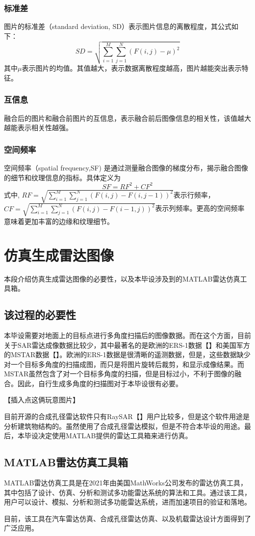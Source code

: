 \documentclass{xduugthesis}
\begin{document}
\subsubsection{标准差}
图片的标准差（standard deviation, SD）表示图片信息的离散程度，其公式如下：
$$SD=\sqrt{\sum_{i=1}^{M}\sum_{j=1}^{N}(F(i,j)-\mu)^2}$$
其中$\mu$表示图片的均值。其值越大，表示数据离散程度越高，图片越能突出表示特征。
\subsubsection{互信息}
融合后的图片和融合前图片的互信息，表示融合前后图像信息的相关性，该值越大越能表示相关性越强。
\subsubsection{空间频率}
空间频率（spatial frequency,SF) 是通过测量融合图像的梯度分布，揭示融合图像的细节和纹理信息的指标。具体定义为
$$SF = RF^2 + CF^2$$
式中, $RF = \sqrt{\sum_{i=1}^{M}\sum_{j=1}^{N}(F(i,j)-F(i,j-1))^2}$表示行频率，$CF = \sqrt{\sum_{i=1}^{M}\sum_{j=1}^{N}(F(i,j)-F(i-1,j))^2}$表示列频率。更高的空间频率意味着更加丰富的边缘和纹理细节。
\section{仿真生成雷达图像}
本段介绍仿真生成雷达图像的必要性，以及本毕设涉及到的MATLAB雷达仿真工具箱。
\subsection{该过程的必要性}
本毕设需要对地面上的目标点进行多角度扫描后的图像数据。而在这个方面，目前关于SAR雷达成像数据比较少，其中最著名的是欧洲的ERS-1数据【】和美国军方的MSTAR数据【】。欧洲的ERS-1数据是很清晰的遥测数据，但是，这些数据缺少对一个目标多角度的扫描成图，而只是将图片旋转后裁剪，和显示成像结果。而MSTAR虽然包含了对一个目标多角度的扫描，但是目标过小，不利于图像的融合。因此，自行生成多角度的扫描图对于本毕设很有必要。\par
【插入点这俩玩意图片】\par
目前开源的合成孔径雷达软件只有RaySAR【】用户比较多，但是这个软件用途是分析建筑物结构的。虽然使用了合成孔径雷达模拟，但是不符合本毕设的用途。最后，本毕设决定使用MATLAB提供的雷达工具箱来进行仿真。
\subsection{MATLAB雷达仿真工具箱}
MATLAB雷达仿真工具是在2021年由美国MathWorks公司发布的雷达仿真工具，其中包括了设计、仿真、分析和测试多功能雷达系统的算法和工具。通过该工具，用户可以设计、模拟、分析和测试多功能雷达系统，进而加速项目的验证和落地。\par
目前，该工具在汽车雷达仿真、合成孔径雷达仿真、以及机载雷达设计方面得到了广泛应用。
\end{document}
